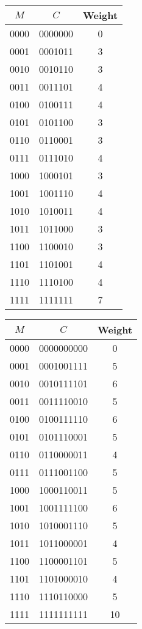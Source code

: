 \documentclass{article}
\begin{document}
\begin{figure}[H]
	\hspace{-0.5cm}
	\begin{minipage}{7cm}
		\centering
		\begin{tabular}{ccc}
			\toprule
			$M$ & $C$ & Weight\\
			\midrule
			0000	&	0000000 	&	0 	\\
			0001	&	0001011		&	3	\\
			0010	&	0010110		&	3	\\
			0011	&	0011101		&	4	\\
			0100	&	0100111		&	4	\\
			0101	&	0101100		&	3	\\
			0110	&	0110001		&	3	\\
			0111	&	0111010		&	4	\\
			1000	&	1000101		&	3	\\
			1001	&	1001110		&	4	\\
			1010	&	1010011		&	4	\\
			1011	&	1011000		&	3	\\
			1100	&	1100010		&	3	\\
			1101	&	1101001		&	4	\\
			1110	&	1110100		&	4	\\
			1111	&	1111111		&	7	\\
			\bottomrule
		\end{tabular}
	\end{minipage}
	\begin{minipage}{7cm}
		\centering
		\begin{tabular}{ccc}
			\toprule
			$M$ & $C$ & Weight\\
			\midrule
			0000	&	0000000000 		&	0 	\\
			0001	&	0001001111		&	5	\\
			0010	&	0010111101		&	6	\\
			0011	&	0011110010		&	5	\\
			0100	&	0100111110		&	6	\\
			0101	&	0101110001		&	5	\\
			0110	&	0110000011		&	4	\\
			0111	&	0111001100		&	5	\\
			1000	&	1000110011		&	5	\\
			1001	&	1001111100		&	6	\\
			1010	&	1010001110		&	5	\\
			1011	&	1011000001		&	4	\\
			1100	&	1100001101		&	5	\\
			1101	&	1101000010		&	4	\\
			1110	&	1110110000		&	5	\\
			1111	&	1111111111		&	10	\\
			\bottomrule
		\end{tabular}
	\end{minipage}
\end{figure}
\end{document}
